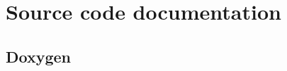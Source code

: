 %
\section{Source code documentation}
\label{sec:source-code-docum}


\subsection{Doxygen}
\label{sec:doxygen}



